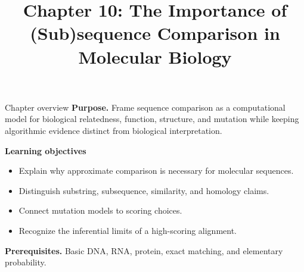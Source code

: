 \documentclass[11pt,letterpaper]{article}
\title{Chapter 10: The Importance of (Sub)sequence Comparison in Molecular Biology}
\author{}
\date{}
\begin{document}
\maketitle

\begin{CornellOverviewBox}{Chapter overview}
\textbf{Purpose.} Frame sequence comparison as a computational model for biological relatedness, function, structure, and mutation while keeping algorithmic evidence distinct from biological interpretation.

\textbf{Learning objectives}
\begin{itemize}
  \item Explain why approximate comparison is necessary for molecular sequences.
  \item Distinguish substring, subsequence, similarity, and homology claims.
  \item Connect mutation models to scoring choices.
  \item Recognize the inferential limits of a high-scoring alignment.
\end{itemize}

\textbf{Prerequisites.} Basic DNA, RNA, protein, exact matching, and elementary probability.
\end{CornellOverviewBox}
\end{document}
